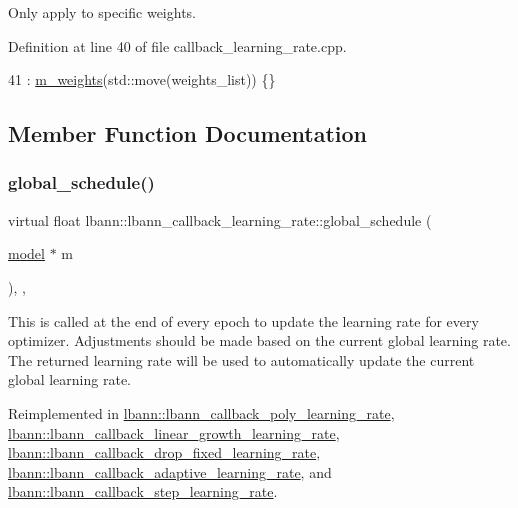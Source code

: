 Only apply to specific weights. 

Definition at line 40 of file callback\+\_\+learning\+\_\+rate.\+cpp.


\begin{DoxyCode}
41                                             : \hyperlink{classlbann_1_1lbann__callback__learning__rate_a0b02e82190e04a22ab26d858041915d7}{m\_weights}(std::move(weights\_list)) \{\}
\end{DoxyCode}


\subsection{Member Function Documentation}
\mbox{\label{classlbann_1_1lbann__callback__learning__rate_a7869b93e5963d6f76da68d8c8137b979}} 
\subsubsection{\texorpdfstring{global\+\_\+schedule()}{global\_schedule()}}
{\footnotesize\ttfamily virtual float lbann\+::lbann\+\_\+callback\+\_\+learning\+\_\+rate\+::global\+\_\+schedule (\begin{DoxyParamCaption}\item[{\hyperlink{classlbann_1_1model}{model} $\ast$}]{m }\end{DoxyParamCaption})\hspace{0.3cm}{\ttfamily [inline]}, {\ttfamily [protected]}, {\ttfamily [virtual]}}

This is called at the end of every epoch to update the learning rate for every optimizer. Adjustments should be made based on the current global learning rate. The returned learning rate will be used to automatically update the current global learning rate. 

Reimplemented in \hyperlink{classlbann_1_1lbann__callback__poly__learning__rate_a6302be36ef16079105b812c7599dac76}{lbann\+::lbann\+\_\+callback\+\_\+poly\+\_\+learning\+\_\+rate}, \hyperlink{classlbann_1_1lbann__callback__linear__growth__learning__rate_ad292e2e7f4078162ed93b6e05d94e0e4}{lbann\+::lbann\+\_\+callback\+\_\+linear\+\_\+growth\+\_\+learning\+\_\+rate}, \hyperlink{classlbann_1_1lbann__callback__drop__fixed__learning__rate_a2ee62bfde00d7f1a4e55e4a334160fbe}{lbann\+::lbann\+\_\+callback\+\_\+drop\+\_\+fixed\+\_\+learning\+\_\+rate}, \hyperlink{classlbann_1_1lbann__callback__adaptive__learning__rate_a6c64fae03736b8acba5c839f59d2ac6f}{lbann\+::lbann\+\_\+callback\+\_\+adaptive\+\_\+learning\+\_\+rate}, and \hyperlink{classlbann_1_1lbann__callback__step__learning__rate_a440671682e8c041a7208af77231059ec}{lbann\+::lbann\+\_\+callback\+\_\+step\+\_\+learning\+\_\+rate}.




